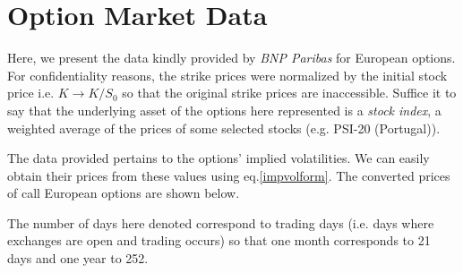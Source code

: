 
\chapter{Option Market Data}
\label{chapter:mktdata}

Here, we present the data kindly provided by \emph{BNP Paribas} for European options. For confidentiality reasons, the strike prices were normalized by the initial stock price i.e. $K\rightarrow K/S_0$ so that the original strike prices are inaccessible.
Suffice it to say that the underlying asset of the options here represented is a \emph{stock index}, a weighted average of the prices of some selected stocks (e.g. PSI-20 (Portugal)).

The data provided pertains to the options' implied volatilities. We can easily obtain their prices from these values using eq.\eqref{impvolform}. The converted prices of call European options are shown below.

The number of days here denoted correspond to trading days (i.e. days where exchanges are open and trading occurs) so that one month corresponds to 21 days and one year to 252.

